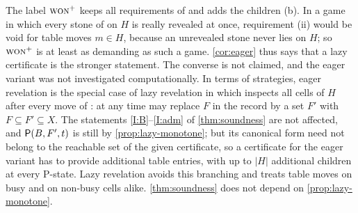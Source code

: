 \begin{remark}\label{rem:eager}
The label $\textup{\textsc{won}}^{+}$ keeps all requirements of \WON{} and adds the children \textup{(b)}. In a game in which
every stone of \Maker{} on $H$ is really revealed at once, requirement \textup{(ii)} would be void for table
moves $m\in H$, because an unrevealed stone never lies on $H$; so $\textup{\textsc{won}}^{+}$ is at least as demanding as such a
game. \cref{cor:eager} thus says that a lazy certificate is the stronger statement. The converse is
not claimed, and the eager variant was not investigated computationally. In terms of strategies, eager
revelation is the special case of lazy revelation in which \Breaker{} inspects all cells of $H$ after every
move of \Maker: at any time \Breaker{} may replace $F$ in the record by a set $F'$ with
$F\subseteq F'\subseteq X$. The statements \ref{I:B}--\ref{I:adm} of \cref{thm:soundness} are not
affected, and $\mathsf{P}(B,F',t)$ is still \WON{} by \cref{prop:lazy-monotone}; but its canonical form
need not belong to the reachable set of the given certificate, so a certificate for the eager variant has to
provide additional table entries, with up to $|H|$ additional children at every P-state. Lazy revelation
avoids this branching and treats table moves on busy and on non-busy cells alike.
\cref{thm:soundness} does not depend on \cref{prop:lazy-monotone}.
\end{remark}
